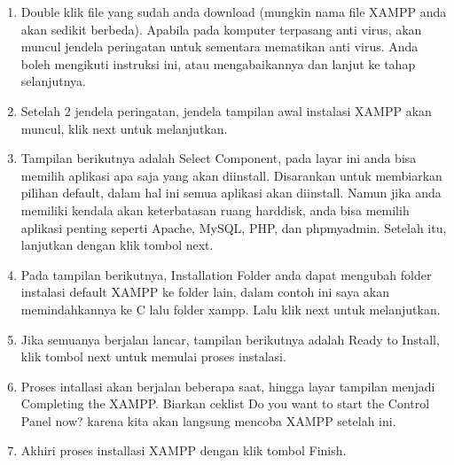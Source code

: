 \begin{enumerate}
\item Double klik file yang sudah anda download (mungkin nama file XAMPP anda akan sedikit berbeda). Apabila pada komputer terpasang anti virus, akan muncul jendela peringatan untuk sementara mematikan anti virus. Anda boleh mengikuti instruksi ini, atau mengabaikannya dan lanjut ke tahap selanjutnya.
\item Setelah 2 jendela peringatan, jendela tampilan awal instalasi XAMPP akan muncul, klik next untuk melanjutkan.
\item Tampilan berikutnya adalah Select Component, pada layar ini anda bisa memilih aplikasi apa saja yang akan diinstall. Disarankan untuk membiarkan pilihan default, dalam hal ini semua aplikasi akan diinstall. Namun jika anda memiliki kendala akan keterbatasan ruang harddisk, anda bisa memilih aplikasi penting seperti Apache, MySQL, PHP, dan phpmyadmin. Setelah itu, lanjutkan dengan klik tombol next.
\item Pada tampilan berikutnya, Installation Folder anda dapat mengubah folder instalasi default XAMPP ke folder lain, dalam contoh ini saya akan memindahkannya ke C lalu folder xampp. Lalu klik next untuk melanjutkan.
\item Jika semuanya berjalan lancar, tampilan berikutnya adalah Ready to Install, klik tombol next untuk memulai proses instalasi.
\item Proses intallasi akan berjalan beberapa saat, hingga layar tampilan menjadi Completing the XAMPP. Biarkan ceklist Do you want to start the Control Panel now?  karena kita akan langsung mencoba XAMPP setelah ini.
\item Akhiri proses installasi XAMPP dengan klik tombol Finish.
\end{enumerate}

